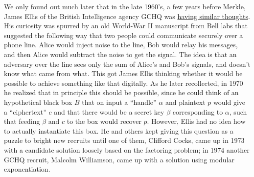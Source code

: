 We only found out much later that in the late 1960's, a few years before
Merkle, James Ellis of the British Intelligence agency GCHQ was
\href{http://cryptome.org/jya/ellisdoc.htm}{having similar thoughts}.
His curiosity was spurred by an old World-War II manuscript from Bell
labs that suggested the following way that two people could communicate
securely over a phone line. Alice would inject noise to the line, Bob
would relay his messages, and then Alice would subtract the noise to get
the signal. The idea is that an adversary over the line sees only the
sum of Alice's and Bob's signals, and doesn't know what came from what.
This got James Ellis thinking whether it would be possible to achieve
something like that digitally. As he later recollected, in 1970 he
realized that in principle this should be possible, since he could think
of an hypothetical black box \(B\) that on input a ``handle'' \(\alpha\)
and plaintext \(p\) would give a ``ciphertext'' \(c\) and that there
would be a secret key \(\beta\) corresponding to \(\alpha\), such that
feeding \(\beta\) and \(c\) to the box would recover \(p\). However,
Ellis had no idea how to actually instantiate this box. He and others
kept giving this question as a puzzle to bright new recruits until one
of them, Clifford Cocks, came up in 1973 with a candidate solution
loosely based on the factoring problem; in 1974 another GCHQ recruit,
Malcolm Williamson, came up with a solution using modular
exponentiation.

